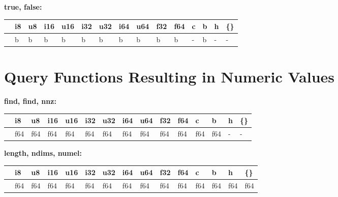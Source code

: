 \textbf{true, false:}
\begin{scriptsize}\begin{tt}\begin{center}\vspace{-.3cm}\begin{tabular}{|m{.65cm}||m{.65cm}|m{.65cm}|m{.65cm}|m{.65cm}|m{.65cm}|m{.65cm}|m{.65cm}|m{.65cm}|m{.65cm}|m{.65cm}|m{.65cm}|m{.65cm}|m{.65cm}|m{.65cm}|}\hline 
&i8&u8&i16&u16&i32&u32&i64&u64&f32&f64&c&b&h&\{\}\\ \hline \hline
&b&b&b&b&b&b&b&b&b&b&-&b&-&-\\ \hline
\end{tabular}\end{center}\end{tt}\end{scriptsize} 


\section{Query Functions Resulting in Numeric Values}

\textbf{find, find, nnz:}
\begin{scriptsize}\begin{tt}\begin{center}\vspace{-.3cm}\begin{tabular}{|m{.65cm}||m{.65cm}|m{.65cm}|m{.65cm}|m{.65cm}|m{.65cm}|m{.65cm}|m{.65cm}|m{.65cm}|m{.65cm}|m{.65cm}|m{.65cm}|m{.65cm}|m{.65cm}|m{.65cm}|}\hline 
&i8&u8&i16&u16&i32&u32&i64&u64&f32&f64&c&b&h&\{\}\\ \hline \hline
&f64&f64&f64&f64&f64&f64&f64&f64&f64&f64&f64&f64&-&-\\ \hline
\end{tabular}\end{center}\end{tt}\end{scriptsize} 

\textbf{length, ndims, numel:}
\begin{scriptsize}\begin{tt}\begin{center}\vspace{-.3cm}\begin{tabular}{|m{.65cm}||m{.65cm}|m{.65cm}|m{.65cm}|m{.65cm}|m{.65cm}|m{.65cm}|m{.65cm}|m{.65cm}|m{.65cm}|m{.65cm}|m{.65cm}|m{.65cm}|m{.65cm}|m{.65cm}|}\hline 
&i8&u8&i16&u16&i32&u32&i64&u64&f32&f64&c&b&h&\{\}\\ \hline \hline
&f64&f64&f64&f64&f64&f64&f64&f64&f64&f64&f64&f64&f64&f64\\ \hline
\end{tabular}\end{center}\end{tt}\end{scriptsize} 

